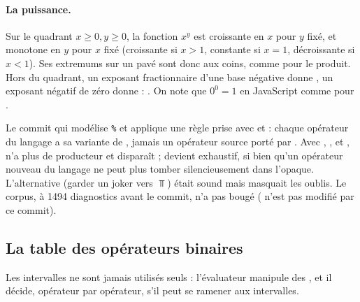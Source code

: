 \paragraph{La puissance.} Sur le quadrant $x \ge 0, y \ge 0$, la fonction
$x^y$ est croissante en $x$ pour $y$ fixé, et monotone en $y$ pour $x$ fixé
(croissante si $x > 1$, constante si $x = 1$, décroissante si $x < 1$). Ses
extremums sur un pavé sont donc aux coins, comme pour le produit. Hors du
quadrant, un exposant fractionnaire d'une base négative donne , un
exposant négatif de zéro donne  : . On note que
$0^0 = 1$ en JavaScript comme pour .

\begin{decision}
  Le commit qui modélise \texttt{\%} et \code{**} applique une règle prise avec
   et  : chaque opérateur du langage a sa variante de
  , jamais un opérateur source porté par . Avec
  , ,  et , 
  n'a plus de producteur et disparaît ;  devient exhaustif,
  si bien qu'un opérateur nouveau du langage ne peut plus tomber
  silencieusement dans l'opaque. L'alternative (garder un joker \code{_}
  vers $\Top$) était sound mais masquait les oublis. Le corpus, à 1494
  diagnostics avant le commit, n'a pas bougé (
  n'est pas modifié par ce commit).
\end{decision}

\subsection{La table des opérateurs binaires}

Les intervalles ne sont jamais utilisés seuls : l'évaluateur manipule des
, et il décide, opérateur par opérateur, s'il peut se ramener
aux intervalles.


